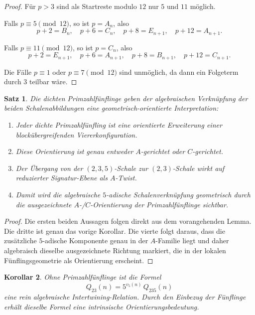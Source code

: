 \documentclass[11pt,a4paper]{article}
\newtheorem{satz}{Satz}
\newtheorem{korollar}[satz]{Korollar}
\theoremstyle{definition}
\theoremstyle{remark}
\begin{document}
	\begin{proof}
		Für \(p>3\) sind als Startreste modulo \(12\) nur \(5\) und \(11\) möglich.
		
		Falls \(p\equiv 5\pmod{12}\), so ist \(p=A_n\), also
		\[
		p+2=B_n,\quad p+6=C_n,\quad p+8=E_{n+1},\quad p+12=A_{n+1}.
		\]
		
		Falls \(p\equiv 11\pmod{12}\), so ist \(p=C_n\), also
		\[
		p+2=E_{n+1},\quad p+6=A_{n+1},\quad p+8=B_{n+1},\quad p+12=C_{n+1}.
		\]
		
		Die Fälle \(p\equiv 1\) oder \(p\equiv 7\pmod{12}\) sind unmöglich, da dann ein Folgeterm durch
		\(3\) teilbar wäre.
	\end{proof}
	
	\begin{satz}
		Die dichten Primzahlfünflinge geben der algebraischen Verknüpfung der beiden Schalenabbildungen
		eine geometrisch-orientierte Interpretation:
		
		\begin{enumerate}[label=\textup{(\roman*)}]
			\item Jeder dichte Primzahlfünfling ist eine orientierte Erweiterung einer blockübergreifenden
			Viererkonfiguration.
			\item Diese Orientierung ist genau entweder \(A\)-gerichtet oder \(C\)-gerichtet.
			\item Der Übergang von der \((2,3,5)\)-Schale zur \((2,3)\)-Schale wirkt auf reduzierter
			Signatur-Ebene als \(A\)-Twist.
			\item Damit wird die algebraische \(5\)-adische Schalenverknüpfung geometrisch durch die
			ausgezeichnete \(A\)-/\(C\)-Orientierung der Primzahlfünflinge sichtbar.
		\end{enumerate}
	\end{satz}
	
	\begin{proof}
		Die ersten beiden Aussagen folgen direkt aus dem vorangehenden Lemma. Die dritte ist genau das
		vorige Korollar. Die vierte folgt daraus, dass die zusätzliche \(5\)-adische Komponente genau in
		der \(A\)-Familie liegt und daher algebraisch dieselbe ausgezeichnete Richtung markiert, die in
		der lokalen Fünflingsgeometrie als Orientierung erscheint.
	\end{proof}
	
	\begin{korollar}
		Ohne Primzahlfünflinge ist die Formel
		\[
		Q_{23}(n)=5^{v_5(n)}\,Q_{235}(n)
		\]
		eine rein algebraische Intertwining-Relation. Durch den Einbezug der Fünflinge erhält dieselbe
		Formel eine intrinsische Orientierungsbedeutung.
	\end{korollar}
	
\end{document}
